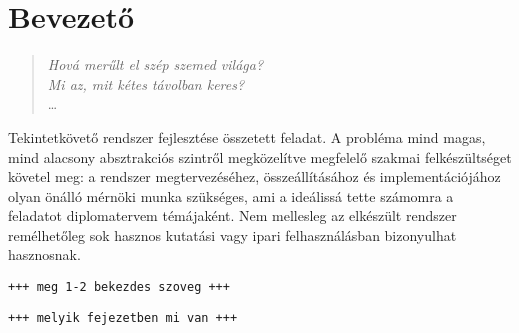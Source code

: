 \chapter*{Bevezető}

\begin{verse}
\begin{flushright}
\emph{Hová merűlt el szép szemed világa? \\
Mi az, mit kétes távolban keres?} \\
\dots
\end{flushright}
\end{verse}

Tekintetkövető rendszer fejlesztése összetett feladat. A probléma mind magas, mind alacsony absztrakciós szintről megközelítve megfelelő szakmai felkészültséget követel meg: a rendszer megtervezéséhez, összeállításához és implementációjához olyan önálló mérnöki munka szükséges, ami a ideálissá tette számomra a feladatot diplomatervem témájaként. Nem mellesleg az elkészült rendszer remélhetőleg sok hasznos kutatási vagy ipari felhasználásban bizonyulhat hasznosnak.

\bigskip

\texttt{+++ meg 1-2 bekezdes szoveg +++}

\bigskip

\texttt{+++ melyik fejezetben mi van +++}